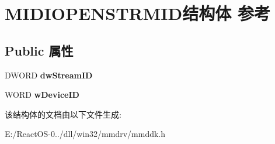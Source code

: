\hypertarget{struct_m_i_d_i_o_p_e_n_s_t_r_m_i_d}{}\section{M\+I\+D\+I\+O\+P\+E\+N\+S\+T\+R\+M\+I\+D结构体 参考}
\label{struct_m_i_d_i_o_p_e_n_s_t_r_m_i_d}
\subsection*{Public 属性}
\begin{DoxyCompactItemize}
\item 
\mbox{\label{struct_m_i_d_i_o_p_e_n_s_t_r_m_i_d_ab0b132acd5136833eb1dbb04c8ddef22}} 
D\+W\+O\+RD {\bfseries dw\+Stream\+ID}
\item 
\mbox{\label{struct_m_i_d_i_o_p_e_n_s_t_r_m_i_d_af2b07a3f4767850f9728d14dca5515b7}} 
W\+O\+RD {\bfseries w\+Device\+ID}
\end{DoxyCompactItemize}


该结构体的文档由以下文件生成\+:\begin{DoxyCompactItemize}
\item 
E\+:/\+React\+O\+S-\/0../dll/win32/mmdrv/mmddk.\+h\end{DoxyCompactItemize}
